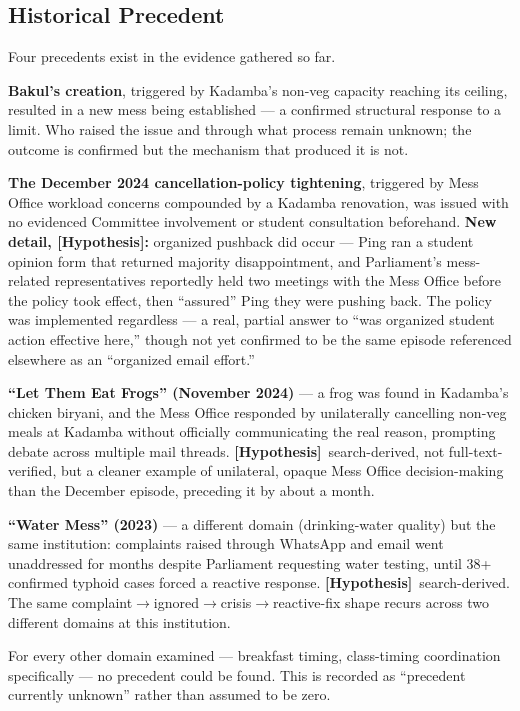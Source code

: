\documentclass[11pt]{article}
\newcommand{\hypo}{\textbf{[Hypothesis]}}
\begin{document}
\subsection{Historical Precedent}

Four precedents exist in the evidence gathered so far.

\textbf{Bakul's creation}, triggered by Kadamba's non-veg capacity reaching its
ceiling, resulted in a new mess being established --- a confirmed structural response
to a limit. Who raised the issue and through what process remain unknown; the outcome
is confirmed but the mechanism that produced it is not.

\textbf{The December 2024 cancellation-policy tightening}, triggered by Mess Office
workload concerns compounded by a Kadamba renovation, was issued with no evidenced
Committee involvement or student consultation beforehand. \textbf{New detail, \hypo:}
organized pushback did occur --- Ping ran a student opinion form that returned
majority disappointment, and Parliament's mess-related representatives reportedly held
two meetings with the Mess Office before the policy took effect, then ``assured''
Ping they were pushing back. The policy was implemented regardless --- a real, partial
answer to ``was organized student action effective here,'' though not yet confirmed
to be the same episode referenced elsewhere as an ``organized email effort.''

\textbf{``Let Them Eat Frogs'' (November 2024)} --- a frog was found in Kadamba's
chicken biryani, and the Mess Office responded by unilaterally cancelling non-veg
meals at Kadamba without officially communicating the real reason, prompting debate
across multiple mail threads. \hypo\ search-derived, not full-text-verified, but a
cleaner example of unilateral, opaque Mess Office decision-making than the December
episode, preceding it by about a month.

\textbf{``Water Mess'' (2023)} --- a different domain (drinking-water quality) but the
same institution: complaints raised through WhatsApp and email went unaddressed for
months despite Parliament requesting water testing, until 38+ confirmed typhoid cases
forced a reactive response. \hypo\ search-derived. The same
complaint$\rightarrow$ignored$\rightarrow$crisis$\rightarrow$reactive-fix shape
recurs across two different domains at this institution.

For every other domain examined --- breakfast timing, class-timing coordination
specifically --- no precedent could be found. This is recorded as ``precedent
currently unknown'' rather than assumed to be zero.
\end{document}

